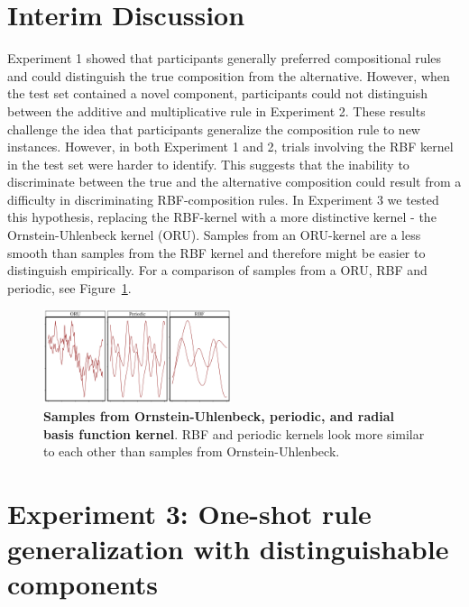 \documentclass[10pt,letterpaper]{article}
\begin{document}
\section{Interim Discussion}
Experiment 1 showed that participants generally preferred compositional rules and could distinguish the true composition from the alternative. However, when the test set contained a novel component, participants could not distinguish between the additive and multiplicative rule in Experiment 2. These results challenge the idea that participants generalize the composition rule to new instances. However, in both Experiment 1 and 2, trials involving the RBF kernel in the test set were harder to identify. This suggests that the inability to discriminate between the true and the alternative composition could result from a difficulty in discriminating RBF-composition rules.
In Experiment 3 we tested this hypothesis, replacing the RBF-kernel with a more distinctive kernel - the Ornstein-Uhlenbeck kernel (ORU). Samples from an ORU-kernel are a less smooth than samples from the RBF kernel and therefore might be easier to distinguish empirically. For a comparison of samples from a ORU, RBF and periodic, see Figure~\ref{fig:rbforu}.


%

\begin{figure}[ht!]
\centering
\includegraphics[width=0.49\textwidth]{oruexamples.pdf}
\caption{\textbf{Samples from Ornstein-Uhlenbeck, periodic, and radial basis function kernel}. RBF and periodic kernels look more similar to each other than samples from Ornstein-Uhlenbeck.}
\label{fig:rbforu}
\end{figure}


\section{Experiment 3: One-shot rule generalization with distinguishable components}
\end{document}
